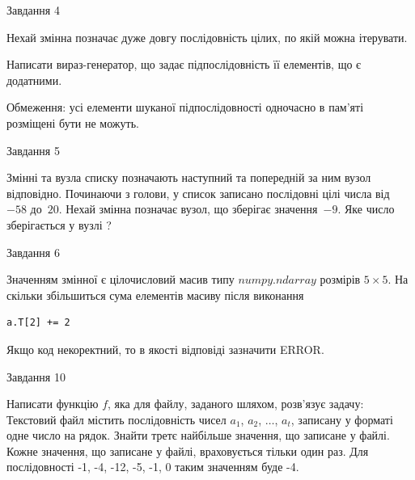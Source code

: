 \documentclass[12pt, ukrainian]{article}
\begin{document}
{\begin{minipage}[t]{8.0cm}
\end{minipage}


               
{\begin{center}Завдання {4}\end{center}}
\vspace{-4mm}
Нехай змінна  позначає дуже довгу послідовність цілих, по якій можна ітерувати.

Написати вираз-генератор, що задає підпослідовність її елементів, що є додатни\-ми.

Обмеження: усі елементи шуканої підпослідовності одночасно в пам'яті розміщені бути не можуть.\par

\vspace{10mm}
               
{\begin{center}Завдання {5}\end{center}}
\vspace{-4mm}
Змінні  та  вузла списку позначають наступний та попередній за ним вузол відповідно. Починаючи з голови, у список записано послідовні цілі числа від~$-58$ до~$20$. Нехай змінна  позначає вузол, що зберігає значення~$-9$.
Яке число зберігається у вузлі  ?\par

               
{\begin{center}Завдання {6}\end{center}}
\vspace{-4mm}
Значенням змінної  є цілочисловий масив типу $numpy.ndarray$ розмірів $5{\times}5$. На скільки збільшиться сума елементів масиву  після виконання
\begin{verbatim}
a.T[2] += 2
\end{verbatim}


Якщо код некоректний, то в якості відповіді зазначити ERROR.\par

               
{\begin{center}Завдання {10}\end{center}}
\vspace{-4mm}

Написати функцію $f$, яка для файлу, заданого шляхом, розв’язує задачу:\\ Текстовий файл містить послідовність чисел $a_1$, $a_2$, $\ldots$, $a_t$, записану у форматі одне число на рядок. Знайти третє найбільше значення, що записане у файлі. Кожне значення, що записане у файлі, враховується тільки один раз. Для послідовності -1, -4, -12, -5, -1, 0 таким значенням буде -4.

}
\end{document}
